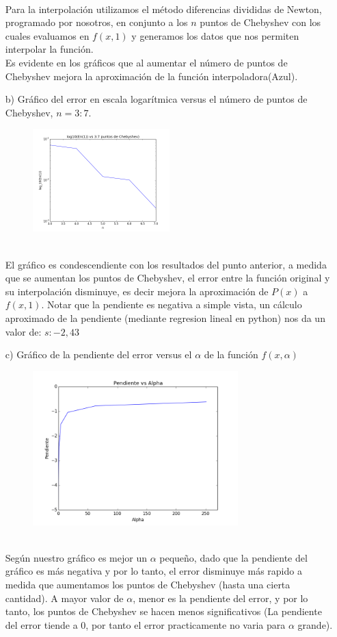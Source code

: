 \documentclass[spanish, fleqn]{article}
\begin{document}
\begin{enumerate}
\begin{figure}[ht!]
			\end{figure}
			\\Para la interpolación utilizamos el método
			diferencias divididas de Newton, programado por 
			nosotros, en conjunto a los $n$ puntos de 
			Chebyshev con los cuales evaluamos en $f(x,1)$ y
			generamos los datos que nos permiten interpolar la 
			función. 
			\\Es evidente en los gráficos que al aumentar el 
			número de puntos de Chebyshev mejora la 
			aproximación de la función interpoladora(Azul).
		\item[b)]
			Gráfico del error en escala logarítmica versus el
			número de puntos de Chebyshev, $n = 3:7$.
			\begin{figure}[ht!]
				\centering
				\includegraphics[width=200px]{Graficos/Error-vs-n.png}
			\end{figure}
			\\El gráfico es condescendiente con los resultados del 
			punto anterior, a medida que se aumentan los puntos de 
			Chebyshev, el error entre la función original y su 
			interpolación disminuye, es decir mejora la aproximación
			de $P(x)$ a $f(x,1)$. Notar que la pendiente es negativa
			a simple vista, un cálculo aproximado de la pendiente 
			(mediante regresion lineal en python) nos da un valor 
			de: $s: -2,43$
\newpage
		\item[c)]
			Gráfico de la pendiente del error versus el $\alpha$
			de la función $f(x, \alpha)$
			\begin{figure}[ht!]
				\centering
				\includegraphics[width=300px]{Graficos/SvsA.png}
			\end{figure}
			\\Según nuestro gráfico es mejor un $\alpha$ pequeño, 
			dado
			que la pendiente del gráfico es más negativa y por lo 
			tanto, el error disminuye más rapido a medida que 
			aumentamos los puntos de Chebyshev (hasta una cierta 
			cantidad). A mayor valor de $\alpha$, menor es la 
			pendiente del error, y por lo tanto, los puntos de 
			Chebyshev se hacen menos significativos (La pendiente
			del error tiende a 0, por tanto el error practicamente
			no varia para $\alpha$ grande).


\end{enumerate}
\end{document}

